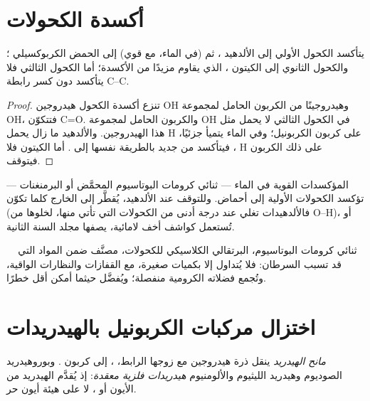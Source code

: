 \section{أكسدة الكحولات}

\begin{proposition}\label{prop:b1:organic-redox:alcohol-oxidation}
يتأكسد الكحول الأولي  إلى الألدهيد ، ثم
(في الماء، مع  قوي) إلى الحمض الكربوكسيلي ؛
والكحول الثانوي  إلى الكيتون ، الذي يقاوم
مزيدًا من الأكسدة؛ أما الكحول الثالثي  فلا يتأكسد دون
كسر رابطة C--C.
\end{proposition}

\begin{proof}
تنزع أكسدة الكحول هيدروجين OH وهيدروجينًا
من الكربون الحامل لمجموعة OH، فتتكوّن C=O. والكربون الحامل لمجموعة OH في الكحول الثالثي لا يحمل
مثل هذا الهيدروجين. والألدهيد ما زال يحمل H على كربون الكربونيل؛ وفي
الماء يتميأ جزئيًا، ، فيتأكسد من جديد بالطريقة
نفسها إلى . أما الكيتون فلا H على ذلك الكربون فيتوقف.
\end{proof}

المؤكسدات القوية في الماء --- ثنائي كرومات البوتاسيوم المحمَّض أو
البرمنغنات --- تؤكسد الكحولات الأولية إلى أحماض. وللتوقف عند
الألدهيد، يُقطَّر إلى الخارج كلما تكوّن (فالألدهيدات تغلي عند درجة أدنى من
الكحولات التي تأتي منها، لخلوها من  O--H)، أو تُستعمل كواشف
أخف لامائية، يصفها مجلد السنة الثانية.

\begin{safety}{\,\,\,\,\,}
ثنائي كرومات البوتاسيوم،  البرتقالي الكلاسيكي للكحولات،
مصنَّف ضمن المواد التي قد تسبب السرطان: فلا يُتداول إلا
بكميات صغيرة، مع القفازات والنظارات الواقية، وتُجمع فضلاته الكرومية
منفصلة؛ ويُفضَّل حيثما أمكن  أقل
خطرًا.
\end{safety}

\section{اختزال مركبات الكربونيل بالهيدريدات}

\begin{definition}\label{def:b1:organic-redox:hydride-donor}
\emph{مانح الهيدريد} ينقل ذرة هيدروجين مع
زوجها الرابط، ، إلى كربون . وبوروهيدريد الصوديوم
 وهيدريد الليثيوم والألومنيوم  \emph{هيدريدات فلزية
معقدة}: إذ يُقدَّم الهيدريد
من الأيون  أو ، لا على هيئة أيون حر.
\end{definition}

